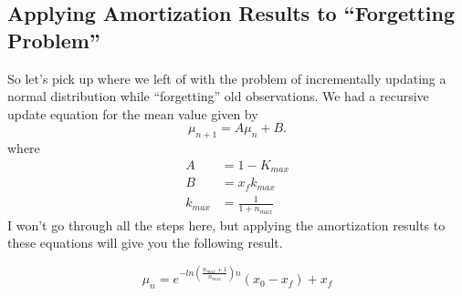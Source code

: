 \documentclass[../../main.tex]{subfiles}
\begin{document}
\subsection{Applying Amortization Results to ``Forgetting Problem''}
So let's pick up where we left of with the problem of incrementally updating a
normal distribution while ``forgetting'' old observations.  We had a recursive
update equation for the mean value given by
\begin{equation}
    \mu_{n+1} = A \mu_n + B. \nonumber
\end{equation}
where
\begin{align}
    A &= 1 - K_{max} \nonumber\\
    B &= x_f k_{max} \nonumber\\
    k_{max} &= \frac{1}{1+n_{max}}
\end{align}
I won't go through all the steps here, but applying the amortization results
to these equations will give you the following result.

\begin{equation}
    \label{eq:exp_solution}
    \mu_n = e^{-ln \left( \frac{n_{max} + 1}{n_{max}}  \right) n}
          \left( x_0 - x_f \right) + x_f
\end{equation}
 
\end{document}
